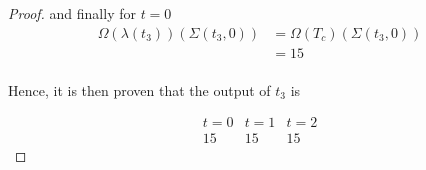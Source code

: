 \documentclass{article}
\begin{document}
\begin{proof}
	and finally for \(t = 0\)
	\begin{align*}
		\Omega(\lambda(t_{3}))(\Sigma(t_{3}, 0)) &= \Omega(T_{c})(\Sigma(t_{3}, 0)) \\
		& = 15 \\ 
	\end{align*}

	Hence, it is then proven that the output of \(t_{3}\) is

	\begin{displaymath}
		\begin{array}{|c|c|c|}
			t = 0 & t = 1 & t = 2\\
 		\hline
			 15 & 15 & 15
 		\end{array}
	\end{displaymath}
\end{proof}
\end{document}
